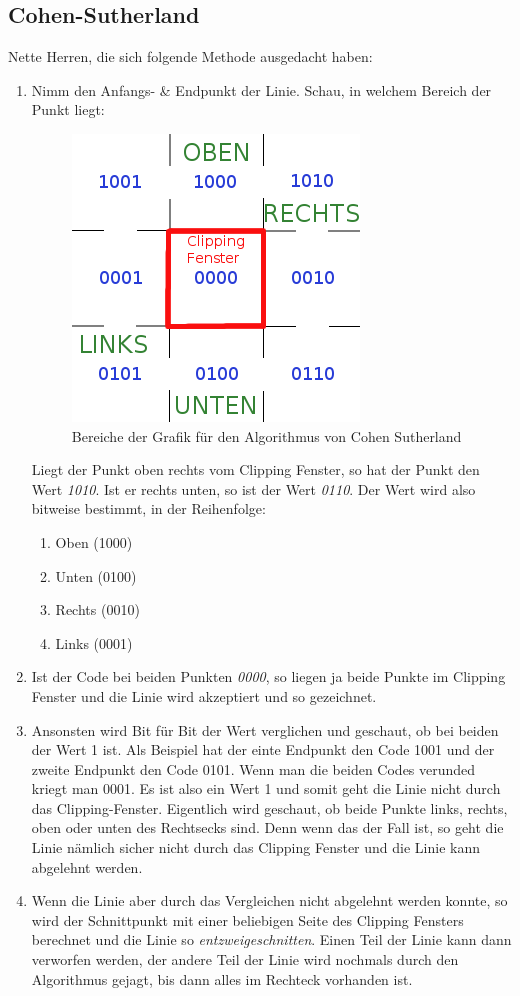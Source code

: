 \subsection{Cohen-Sutherland}
Nette Herren, die sich folgende Methode ausgedacht haben:
\begin{enumerate}
	\item Nimm den Anfangs- \& Endpunkt der Linie. Schau, in welchem Bereich der Punkt liegt:
	
	\begin{figure}[!ht]
		\centering
		\includegraphics[width=0.3\linewidth]{fig/cohen_sutherland}
		\caption{Bereiche der Grafik für den Algorithmus von Cohen Sutherland}
		\label{fig:cohen_sutherland}
	\end{figure}
	
	Liegt der Punkt oben rechts vom Clipping Fenster, so hat der Punkt den Wert \textit{1010}. Ist er rechts unten, so ist der Wert \textit{0110}. Der Wert wird also bitweise bestimmt, in der Reihenfolge:
	\begin{enumerate}
		\item Oben (1000)
		\item Unten (0100)
		\item Rechts (0010)
		\item Links (0001)
	\end{enumerate}
	\item Ist der Code bei beiden Punkten \textit{0000}, so liegen ja beide Punkte im Clipping Fenster und die Linie wird akzeptiert und so gezeichnet.
	\item Ansonsten wird Bit für Bit der Wert verglichen und geschaut, ob bei beiden der Wert 1 ist. Als Beispiel hat der einte Endpunkt den Code 1001 und der zweite Endpunkt den Code 0101. Wenn man die beiden Codes verunded kriegt man 0001. Es ist also ein Wert 1 und somit geht die Linie nicht durch das Clipping-Fenster. Eigentlich wird geschaut, ob beide Punkte links, rechts, oben oder unten des Rechtsecks sind. Denn wenn das der Fall ist, so geht die Linie nämlich sicher nicht durch das Clipping Fenster und die Linie kann abgelehnt werden.
	\item Wenn die Linie aber durch das Vergleichen nicht abgelehnt werden konnte, so wird der Schnittpunkt mit einer beliebigen Seite des Clipping Fensters berechnet und die Linie so \textit{entzweigeschnitten}. Einen Teil der Linie kann dann verworfen werden, der andere Teil der Linie wird nochmals durch den Algorithmus gejagt, bis dann alles im Rechteck vorhanden ist.
\end{enumerate}

